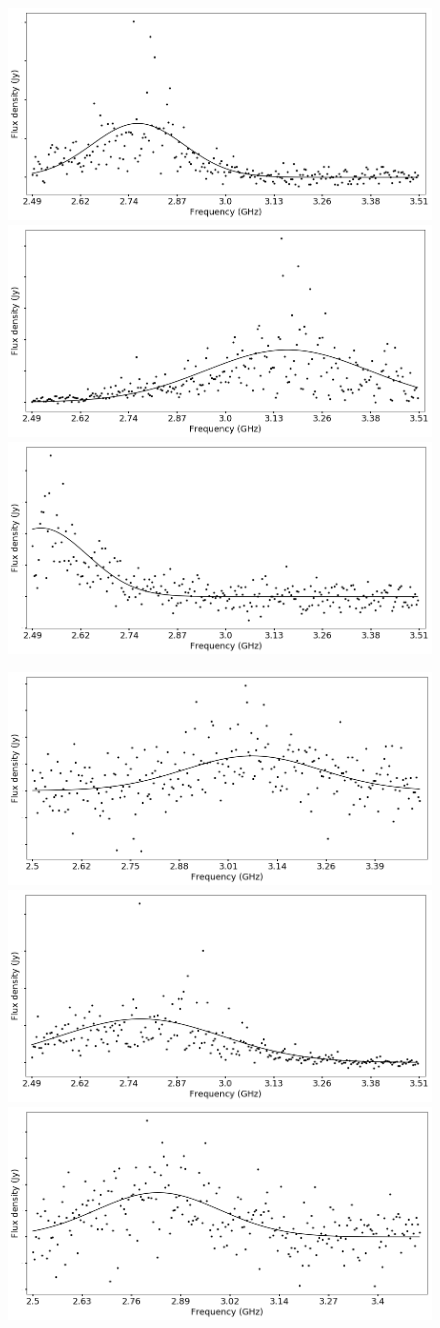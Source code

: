 \documentclass[twocolumn]{aastex61}
\begin{document}
\begin{figure}[ht]
\begin{center}
 \begin{minipage}{2\columnwidth}
  \includegraphics[width=0.33\columnwidth]{spec_57623.png}
  \includegraphics[width=0.33\columnwidth]{spec_57633_scan7.png}
  \includegraphics[width=0.33\columnwidth]{spec_57633_scan13.png}
 \end{minipage}

 \begin{minipage}{2\columnwidth}
  \includegraphics[width=0.33\columnwidth]{spec_57638.png}
  \includegraphics[width=0.33\columnwidth]{spec_57643.png}
  \includegraphics[width=0.33\columnwidth]{spec_57645.png}
 \end{minipage}


\end{center}
\end{figure}
\end{document}
